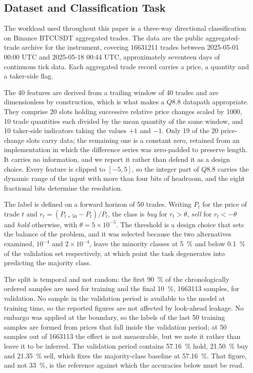 \documentclass[final,5p,times,twocolumn]{elsarticle}
\begin{document}
\subsection{Dataset and Classification Task}
\label{sec:dataset}
The workload used throughout this paper is a three-way directional
classification on Binance BTCUSDT aggregated trades. The data are the public
aggregated-trade archive for the instrument, covering
\num{16631211} trades between 2025-05-01 00:00 UTC and 2025-05-18 00:44 UTC,
approximately seventeen days of continuous tick data. Each aggregated trade
record carries a price, a quantity and a taker-side flag.

The 40 features are derived from a trailing window of 40 trades and are
dimensionless by construction, which is what makes a $Q8.8$ datapath
appropriate. They comprise 20 slots holding successive relative price changes scaled by
\num{1000}, 10 trade quantities each divided by the mean quantity of the same
window, and 10 taker-side indicators taking the values $+1$ and $-1$. Only 19 of
the 20 price-change slots carry data; the remaining one is a constant zero,
retained from an implementation in which the difference series was zero-padded to
preserve length. It carries no information, and we report it rather than defend
it as a design choice. Every feature is clipped to $[-5, 5]$, so the integer part of
$Q8.8$ carries the dynamic range of the input with more than four bits of
headroom, and the eight fractional bits determine the resolution.

The label is defined on a forward horizon of 50 trades. Writing $P_t$ for the
price of trade $t$ and
$r_t = (P_{t+50} - P_t)/P_t$, the class is \emph{buy} for
$r_t > \theta$, \emph{sell} for $r_t < -\theta$ and \emph{hold} otherwise, with
$\theta = 5 \times 10^{-5}$. The threshold is a design choice that sets the
balance of the problem, and it was selected because the two alternatives
examined, $10^{-4}$ and $2 \times 10^{-4}$, leave the minority classes at
\SI{5}{\percent} and below \SI{0.1}{\percent} of the validation set
respectively, at which point the task degenerates into predicting the majority
class.

The split is temporal and not random: the first \SI{90}{\percent} of the
chronologically ordered samples are used for training and the final
\SI{10}{\percent}, \num{1663113} samples, for validation. No sample in the
validation period is available to the model at training time, so the reported
figures are not affected by look-ahead leakage. No embargo was applied at the
boundary, so the labels of the last 50 training samples are formed from prices
that fall inside the validation period; at 50 samples out of \num{1663113} the
effect is not measurable, but we note it rather than leave it to be inferred. The validation period contains
\SI{57.16}{\percent} hold, \SI{21.50}{\percent} buy and \SI{21.35}{\percent}
sell, which fixes the majority-class baseline at \SI{57.16}{\percent}. That
figure, and not \SI{33}{\percent}, is the reference against which the accuracies
below must be read.
\end{document}

